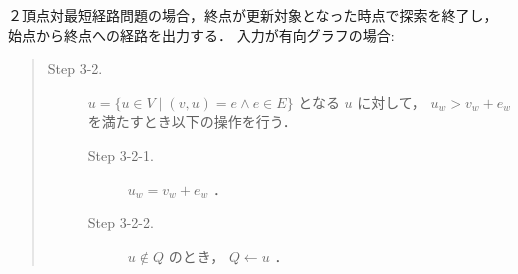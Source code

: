 \documentclass[12pt]{optlab-bachelor}
\begin{document}
２頂点対最短経路問題の場合，終点が更新対象となった時点で探索を終了し，
始点から終点への経路を出力する．
入力が有向グラフの場合:
\begin{quote}
\begin{description}
\item[Step 3-2.] $u = \{ u \in V \mid (v,u) = e \land e \in E \}$ となる $u$ に対して，
$u_w > v_w + e_w$ を満たすとき以下の操作を行う．
\begin{description}
  \item[Step 3-2-1.] $u_w = v_w + e_w$ ．
  \item[Step 3-2-2.] $u \notin Q$ のとき， $Q \leftarrow u$ ．
\end{description}
\end{description}
\end{quote}
\end{document}
